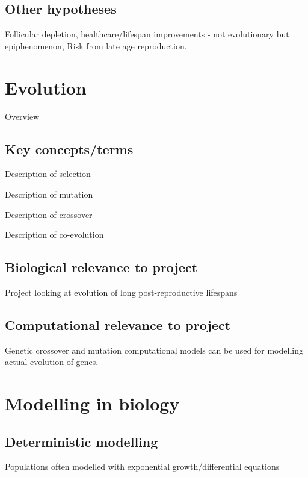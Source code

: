 \documentclass[authoryearcitations]{UoYCSproject}
\begin{document}
\subsection{Other hypotheses}
Follicular depletion, healthcare/lifespan improvements - not evolutionary but epiphenomenon, Risk from late age reproduction.

\section{Evolution}
Overview \cite{origin1859}

\subsection{Key concepts/terms}
\begin{description}[style=nextline]
\item[Selection] Description of selection

\item [Mutation] Description of mutation

\item [Crossover] Description of crossover

\item [Coevolution] Description of co-evolution
\end{description}

\subsection{Biological relevance to project}
Project looking at evolution of long post-reproductive lifespans

\subsection{Computational relevance to project}
Genetic crossover and mutation computational models can be used for modelling actual evolution of genes.

\section{Modelling in biology}


\subsection{Deterministic modelling}
Populations often modelled with exponential growth/differential equations
\end{document}
